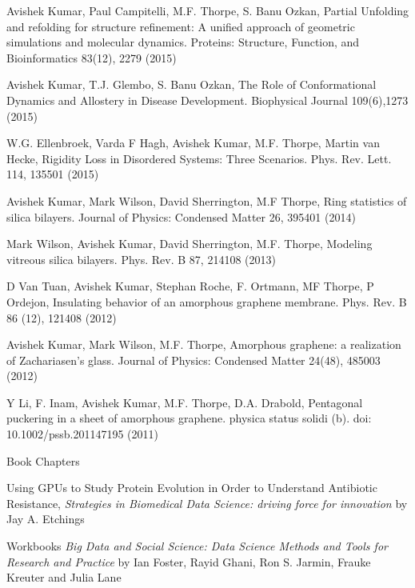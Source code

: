 \begin{cventries}
{\begin{cvitems}
    \item Avishek Kumar, Paul Campitelli, M.F. Thorpe, S. Banu Ozkan, Partial Unfolding and refolding for
structure refinement: A unified approach of geometric simulations and molecular dynamics. Proteins:
Structure, Function, and Bioinformatics 83(12), 2279 (2015)
    \item Avishek Kumar, T.J. Glembo, S. Banu Ozkan, The Role of Conformational Dynamics and Allostery in
Disease Development. Biophysical Journal 109(6),1273 (2015)
    \item W.G. Ellenbroek, Varda F Hagh, Avishek Kumar, M.F. Thorpe, Martin van Hecke, Rigidity Loss in
Disordered Systems: Three Scenarios. Phys. Rev. Lett. 114, 135501 (2015)
    \item Avishek Kumar, Mark Wilson, David Sherrington, M.F Thorpe, Ring statistics of silica bilayers.
Journal of Physics: Condensed Matter 26, 395401 (2014)
    \item Mark Wilson, Avishek Kumar, David Sherrington, M.F. Thorpe, Modeling vitreous silica bilayers.
Phys. Rev. B 87, 214108 (2013)
    \item D Van Tuan, Avishek Kumar, Stephan Roche, F. Ortmann, MF Thorpe, P Ordejon, Insulating behavior
of an amorphous graphene membrane. Phys. Rev. B 86 (12), 121408 (2012)
    \item Avishek Kumar, Mark Wilson, M.F. Thorpe, Amorphous graphene: a realization of Zachariasen’s
glass. Journal of Physics: Condensed Matter 24(48), 485003 (2012)
    \item Y Li, F. Inam, Avishek Kumar, M.F. Thorpe, D.A. Drabold, Pentagonal puckering in a sheet of
amorphous graphene. physica status solidi (b). doi: 10.1002/pssb.201147195 (2011)
\end{cvitems}
}

\cventry{}
    {Book Chapters}
    {}
    {}
    {\begin{cvitems}
    \vspace{-1\baselineskip}
    \setlength\itemsep{.5em}
    \item Using GPUs to Study Protein Evolution in Order to Understand Antibiotic Resistance, \textit{Strategies in Biomedical Data Science: driving force for innovation} by Jay A. Etchings
    \item Workbooks \textit{Big Data and Social Science: Data Science Methods and Tools for Research and Practice} by Ian Foster, Rayid Ghani, Ron S. Jarmin, Frauke Kreuter and Julia Lane
\end{cvitems}}




\end{cventries}
